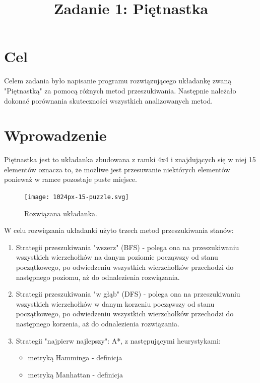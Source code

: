\documentclass{classrep}
\author{
  \studentinfo{Paweł Białek}{216723} \and
  \studentinfo{Łukasz Kostrzewa}{216804}
}
\title{Zadanie 1: Piętnastka}
\begin{document}
\maketitle


\section{Cel}
{\color{black}
Celem zadania było napisanie programu rozwiązującego układankę zwaną "Piętnastką" za pomocą różnych metod przeszukiwania. Następnie należało dokonać porównania
skuteczności wszystkich analizowanych metod.}

\section{Wprowadzenie}
{\color{black}
Piętnastka jest to układanka zbudowana z ramki 4x4  i znajdujących się w niej 15 elementów oznacza to, że możliwe jest przesuwanie niektórych elementów ponieważ w ramce pozostaje puste miejsce.
\begin{figure}
\centering
\texttt{[image: 1024px-15-puzzle.svg]}
\caption{Rozwiązana układanka.}
\end{figure}
\newpage
W celu rozwiązania układanki użyto trzech metod przeszukiwania stanów:
\begin{enumerate}
\item Strategii przeszukiwania "wszerz" (BFS) - polega ona na przeszukiwaniu wszystkich wierzchołków na danym poziomie począwszy od stanu początkowego, po odwiedzeniu wszystkich wierzchołków przechodzi do następnego poziomu, aż do odnalezienia rozwiązania.
\item Strategii przeszukiwania "w głąb" (DFS) - polega ona na przeszukiwaniu wszystkich wierzchołków w danym korzeniu począwszy od stanu początkowego, po odwiedzeniu wszystkich wierzchołków przechodzi do następnego korzenia, aż do odnalezienia rozwiązania. 
\item Strategii "najpierw najlepszy": A*, z następującymi heurystykami: 
\begin{itemize}
\item metryką Hamminga - definicja
\item metryką Manhattan - definicja 
\end{itemize}
\end{enumerate}}
\end{document}
